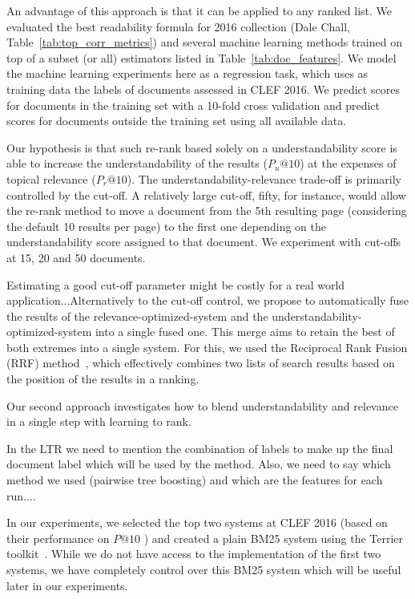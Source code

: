 An advantage of this approach is that it can be applied to any ranked list.
We evaluated the best readability formula for 2016 collection (Dale Chall, Table~\ref{tab:top_corr_metrics}) and several machine learning methods trained on top of a subset (or all) estimators listed in Table~\ref{tab:doc_features}. We model the machine learning experiments here as a regression task, which uses as training data the labels of documents assessed in CLEF 2016.
We predict scores for documents in the training set with a 10-fold cross validation and predict scores for documents outside the training set using all available data.

Our hypothesis is that such re-rank based solely on a understandability score is able to increase the understandability of the results ($P_u@10$) at the expenses of topical relevance ($P_r@10$). The understandability-relevance trade-off is primarily controlled by the cut-off. A relatively large cut-off, fifty, for instance, would allow the re-rank method to move a document from the 5th resulting page (considering the default 10 results per page) to the first one depending on the understandability score assigned to that document. We experiment with cut-offs at 15, 20 and 50 documents. 

Estimating a good cut-off parameter might be costly for a real world application...Alternatively to the cut-off control, we propose to automatically fuse the results of the relevance-optimized-system and the understandability-optimized-system into a single fused one.
This merge aims to retain the best of both extremes into a single system. For this, we used the Reciprocal Rank Fusion (RRF) method~\cite{cormack09}, which effectively combines two lists of search results based on the position of the results in a ranking.

Our second approach investigates how to blend understandability and relevance in a single step with learning to rank.


In the LTR we need to mention the combination of labels to make up the final document label which will be used by the method. Also, we need to say which method we used (pairwise tree boosting) and which are the features for each run....


In our experiments, we selected the top two systems at CLEF 2016 (based on their performance on $P@10$ ) 
and created a plain BM25 system using the Terrier toolkit~\cite{terrier}. While we do not have access to the implementation of the first two systems, we have completely control over this BM25 system which will be useful later in our experiments.



